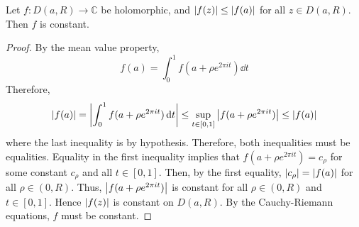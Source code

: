 \begin{theorem}
	Let \( f \colon D(a,R) \to \mathbb C \) be holomorphic, and \( \abs{f(z)} \leq \abs{f(a)} \) for all \( z \in D(a,R) \).
	Then \( f \) is constant.
\end{theorem}
\begin{proof}
	By the mean value property,
	\[
		f(a) = \int_0^1 f(a+\rho e^{2 \pi i t}) \dd{t}
	\]
	Therefore,
	\[
		\abs{f(a)} = \abs{\int_0^1 f(a + \rho e^{2 \pi i t}) \dd{t}} \leq \sup_{t \in [0,1]} \abs{f(a+\rho e^{2 \pi i t})} \leq \abs{f(a)}
	\]
	where the last inequality is by hypothesis.
	Therefore, both inequalities must be equalities.
	Equality in the first inequality implies that \( f(a+\rho e^{2 \pi i t}) = c_\rho \) for some constant \( c_\rho \) and all \( t \in [0,1] \).
	Then, by the first equality, \( \abs{c_\rho} = \abs{f(a)} \) for all \( \rho \in (0,R) \).
	Thus, \( \abs{f(a+\rho e^{2 \pi i t})} \) is constant for all \( \rho \in (0,R) \) and \( t \in [0,1] \).
	Hence \( \abs{f(z)} \) is constant on \( D(a,R) \).
	By the Cauchy-Riemann equations, \( f \) must be constant.
\end{proof}

